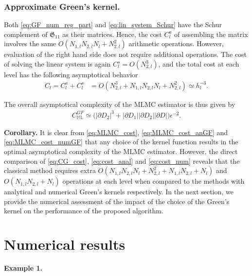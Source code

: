 \subsubsection{Approximate Green's kernel.}
\label{sec:numGF_complexity}

Both \eqref{eq:GF_num_reg_part} and \eqref{eq:lin_system_Schur} have  the Schur complement of $\boldsymbol{\mathfrak{G}}_{11}$ as their matrices.
Hence, the cost $C_{l}^a$ of assembling the matrix involves the same $O( N_{1,l} N_{2,l} N_{l} + N_{2,l}^2)$ arithmetic operations.
However, evaluation of the right hand side does not require additional operations.
The cost of solving the linear system is again $C_l^s = O(N_{2,l}^3)$, and the total cost at each level has the following asymptotical behavior 
\begin{align} \label{eq:cost_num}
	C_l = C_l^a + C_l^{s} &= O \left( N_{2,l}^{3} + N_{1,l} N_{2,l} N_{l} + N_{2,l}^2 \right)
	\simeq h_l^{-3}.
\end{align}

The overall asymptotical complexity of the MLMC estimator is thus given by
\begin{align}\label{eq:MLMC_cost_numGF}
	C_{\mathbb{ML}}^{GF}
	\simeq
	\big( |\partial D_2|^3 + |\partial D_1| |\partial D_2| |\partial D| \big) \epsilon^{-2}.
\end{align}


\textbf{Corollary.}
It is clear from \eqref{eq:MLMC_cost}, \eqref{eq:MLMC_cost_anGF} and \eqref{eq:MLMC_cost_numGF} that any choice of the kernel function results in the optimal asymptotical complexity of the MLMC estimator.
However, the direct comparison of \eqref{eq:CG_cost}, \eqref{eq:cost_anal} and \eqref{eq:cost_num} reveals that the classical method requires extra $O(N_{1,l} N_{2,l} N_{l} + N_{2,l}^2 + N_{1,l}N_{2,l} + N_{l})$ and $O(N_{1,l}N_{2,l} + N_{l})$ operations at each level when compared to the methods with analytical and numerical Green's kernels respectively.
In the next section, we provide the numerical assessment of the impact of the choice of the Green's kernel on the performance of the proposed algorithm.



\section{Numerical results}
\label{sec:numerical}

\paragraph{\bf{Example 1.}}

